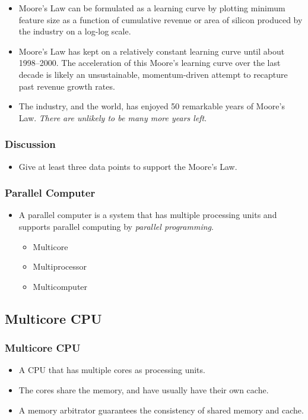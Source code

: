 \documentclass{beamer}
\begin{document}
\begin{CJK}{UTF8}{bsmi}
\begin{frame}
\begin{itemize}
\item Moore's Law can be formulated as a learning curve by plotting
  minimum feature size as a function of cumulative revenue or area of
  silicon produced by the industry on a log-log scale.
\item Moore's Law has kept on a relatively constant learning curve
  until about 1998–2000. The acceleration of this Moore's learning
  curve over the last decade is likely an unsustainable,
  momentum-driven attempt to recapture past revenue growth rates.
\item The industry, and the world, has enjoyed 50 remarkable years of
  Moore's Law. {\em There are unlikely to be many more years left}.
\end{itemize}
\end{frame}

\begin{frame}
\frametitle{Discussion} 
\begin{itemize}
\item Give at least three data points to support the Moore's Law.
\end{itemize}
\end{frame}


\begin{frame}
\frametitle{Parallel Computer} 
\begin{itemize}
\item A parallel computer is a system that has multiple processing
  units and supports parallel computing by {\em parallel programming}.
\begin{itemize}
\item Multicore
\item Multiprocessor
\item Multicomputer
\end{itemize}
\end{itemize}
\end{frame}


\subsection{Multicore CPU}

\begin{frame}
\frametitle{Multicore CPU}
\begin{itemize}
\item A CPU that has multiple cores as processing units.
\item The cores share the memory, and have usually have their own
  cache.
\item A memory arbitrator guarantees the consistency of shared memory
  and cache.
\end{itemize}
\end{frame}


\end{CJK}
\end{document}
